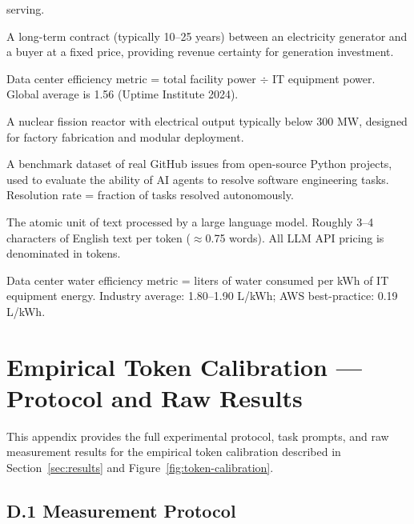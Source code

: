 \documentclass{article}
\begin{document}
\begin{description}
    serving.
  \item[PPA (Power Purchase Agreement)] A long-term contract (typically 10--25 years)
    between an electricity generator and a buyer at a fixed price, providing revenue
    certainty for generation investment.
  \item[PUE (Power Usage Effectiveness)] Data center efficiency metric = total facility
    power $\div$ IT equipment power. Global average is 1.56 (Uptime Institute 2024).
  \item[SMR (Small Modular Reactor)] A nuclear fission reactor with electrical output
    typically below 300 MW, designed for factory fabrication and modular deployment.
  \item[SWE-bench] A benchmark dataset of real GitHub issues from open-source Python
    projects, used to evaluate the ability of AI agents to resolve software engineering
    tasks. Resolution rate = fraction of tasks resolved autonomously.
  \item[Token] The atomic unit of text processed by a large language model. Roughly 3--4
    characters of English text per token ($\approx$0.75 words). All LLM API pricing is
    denominated in tokens.
  \item[WUE (Water Usage Effectiveness)] Data center water efficiency metric = liters of
    water consumed per kWh of IT equipment energy. Industry average: 1.80--1.90 L/kWh;
    AWS best-practice: 0.19 L/kWh.
\end{description}

\section{Empirical Token Calibration --- Protocol and Raw Results}
\label{app:calibration}

This appendix provides the full experimental protocol, task prompts, and raw measurement
results for the empirical token calibration described in Section~\ref{sec:results}
and Figure~\ref{fig:token-calibration}.

\subsection*{D.1 Measurement Protocol}
\end{document}
